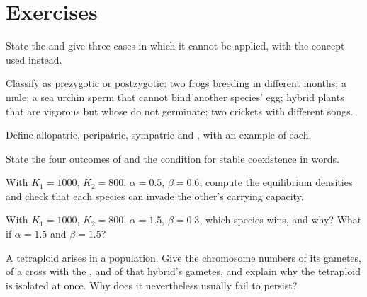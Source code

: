\section{Exercises}

\begin{exercise}[$\star$]\label{exo:b2:speciation:1}
State the  and give three cases in which
it cannot be applied, with the concept used instead.
\end{exercise}

\begin{exercise}[$\star$]\label{exo:b2:speciation:2}
Classify as prezygotic or postzygotic: two frogs breeding in
different months; a mule; a sea urchin sperm that cannot bind
another species' egg; hybrid plants that are vigorous but whose
 do not germinate; two crickets with different songs.
\end{exercise}

\begin{exercise}[$\star$]\label{exo:b2:speciation:3}
Define allopatric, peripatric, sympatric and , with an example of each.
\end{exercise}

\begin{exercise}[$\star$]\label{exo:b2:speciation:4}
State the four outcomes of  and the
condition for stable coexistence in words.
\end{exercise}

\begin{exercise}[$\star\star$]\label{exo:b2:speciation:5}
With $K_1 = 1000$, $K_2 = 800$, $\alpha = 0.5$, $\beta = 0.6$,
compute the equilibrium densities and check that each species can
invade the other's carrying capacity.
\end{exercise}

\begin{exercise}[$\star\star$]\label{exo:b2:speciation:6}
With $K_1 = 1000$, $K_2 = 800$, $\alpha = 1.5$, $\beta = 0.3$, which
species wins, and why? What if $\alpha = 1.5$ and $\beta = 1.5$?
\end{exercise}

\begin{exercise}[$\star\star$]\label{exo:b2:speciation:7}
A tetraploid arises in a  population. Give the chromosome
numbers of its gametes, of a cross with the , and of that
hybrid's gametes, and explain why the tetraploid is isolated at
once. Why does it nevertheless usually fail to persist?
\end{exercise}

